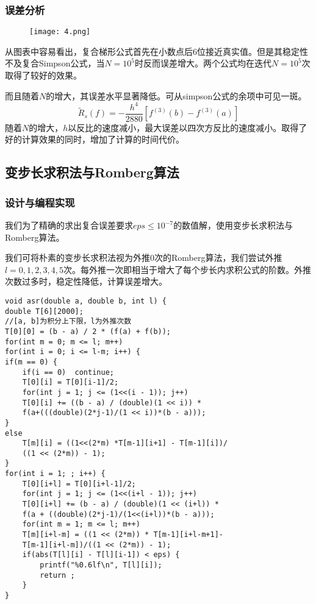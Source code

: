 \documentclass[UTF8]{ctexart}
\begin{document}
	\subsubsection{误差分析}
	\begin{figure}[h]
		\centerline{\texttt{[image: 4.png]}}
	\end{figure}
	从图表中容易看出，复合梯形公式首先在小数点后6位接近真实值。但是其稳定性不及复合Simpson公式，当$N = 10^5$时反而误差增大。两个公式均在迭代$N = 10^5$次取得了较好的效果。
	
	而且随着$N$的增大，其误差水平显著降低。可从simpson公式的余项中可见一斑。
	\[\tilde{R}_s(f)=-\frac{h^4}{2880}[f^{(3)}(b) - f^{(3)}(a)]\]
	随着$N$的增大，$h$以反比的速度减小，最大误差以四次方反比的速度减小。取得了好的计算效果的同时，增加了计算的时间代价。
	\subsection{变步长求积法与Romberg算法}
	
	\subsubsection{设计与编程实现}
	
	我们为了精确的求出复合误差要求$eps \leq 10^{-7}$的数值解，使用变步长求积法与Romberg算法。
	
	我们可将朴素的变步长求积法视为外推0次的Romberg算法，我们尝试外推$l = 0, 1, 2, 3, 4, 5$次。每外推一次即相当于增大了每个步长内求积公式的阶数。外推次数过多时，稳定性降低，计算误差增大。
	
		\lstset{language=C++}%
	
	\begin{lstlisting}
void asr(double a, double b, int l) {
double T[6][2000];
//[a, b]为积分上下限，l为外推次数
T[0][0] = (b - a) / 2 * (f(a) + f(b));
for(int m = 0; m <= l; m++)
for(int i = 0; i <= l-m; i++) {
if(m == 0) {
	if(i == 0)	continue; 
	T[0][i] = T[0][i-1]/2;
	for(int j = 1; j <= (1<<(i - 1)); j++) 
	T[0][i] += ((b - a) / (double)(1 << i)) * 
	f(a+(((double)(2*j-1)/(1 << i))*(b - a)));				
}
else 
	T[m][i] = ((1<<(2*m) *T[m-1][i+1] - T[m-1][i])/
	((1 << (2*m)) - 1);
}
for(int i = 1; ; i++) {
	T[0][i+l] = T[0][i+l-1]/2;
	for(int j = 1; j <= (1<<(i+l - 1)); j++) 
	T[0][i+l] += (b - a) / (double)(1 << (i+l)) * 
	f(a + ((double)(2*j-1)/(1<<(i+l))*(b - a)));
	for(int m = 1; m <= l; m++)
	T[m][i+l-m] = ((1 << (2*m)) * T[m-1][i+l-m+1]-
	T[m-1][i+l-m])/((1 << (2*m)) - 1);
	if(abs(T[l][i] - T[l][i-1]) < eps) {
		printf("%0.6lf\n", T[l][i]);
		return ;
	}
}	
	\end{lstlisting}
\end{document}
